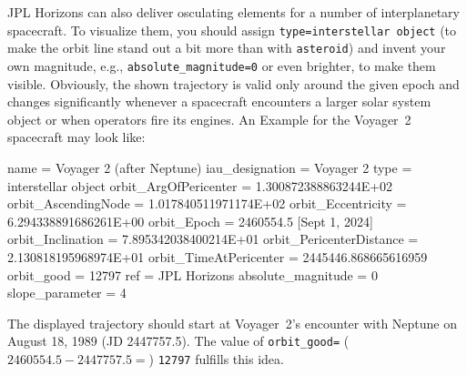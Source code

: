 
\noindent JPL Horizons can also deliver osculating elements for a number of interplanetary spacecraft. 
To visualize them, you should assign \texttt{type=interstellar object} 
(to make the orbit line stand out a bit more than with \texttt{asteroid}) 
and invent your own magnitude, e.g., \texttt{absolute\_magnitude=0} or even brighter, to make them visible. 
Obviously, the shown trajectory is valid only around the given epoch and changes significantly whenever a spacecraft 
encounters a larger solar system object or when operators fire its engines. An Example for the Voyager~2 spacecraft may look like:

\begin{configfile}[\scriptsize]
[voyager2]
name                           = Voyager 2 (after Neptune)
iau_designation                = Voyager 2
type                           = interstellar object
orbit_ArgOfPericenter          = 1.300872388863244E+02
orbit_AscendingNode            = 1.017840511971174E+02
orbit_Eccentricity             = 6.294338891686261E+00
orbit_Epoch                    = 2460554.5               [Sept 1, 2024]
orbit_Inclination              = 7.895342038400214E+01
orbit_PericenterDistance       = 2.130818195968974E+01
orbit_TimeAtPericenter         = 2445446.868665616959
orbit_good                     = 12797
ref                            = JPL Horizons 
absolute_magnitude             = 0
slope_parameter                = 4
\end{configfile}

\noindent The displayed trajectory should start at Voyager~2's encounter with Neptune on August 18, 1989 (JD 2447757.5). 
The value of \texttt{orbit\_good=} ($2460554.5-2447757.5 = $) \texttt{12797} fulfills this idea. 



